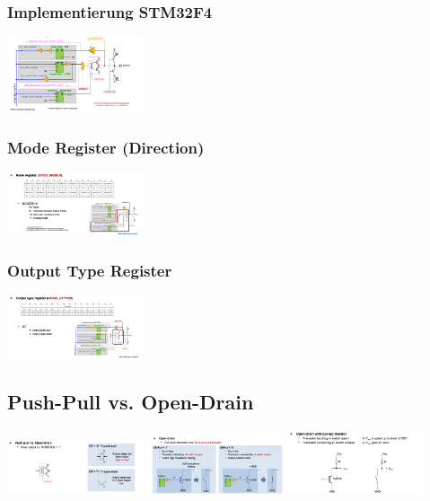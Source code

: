 \subsubsection{Implementierung STM32F4}
\includegraphics[width=0.3\textwidth]{sections/images/gpio.png}

\subsubsection{Mode Register (Direction)}
\includegraphics[width=0.3\textwidth]{sections/images/mode_register.png}

\subsubsection{Output Type Register}
\includegraphics[width=0.3\textwidth]{sections/images/out_type.png}

\subsection{Push-Pull vs. Open-Drain}
\includegraphics[width=0.3\textwidth]{sections/images/push_pull1.png}
\includegraphics[width=0.3\textwidth]{sections/images/push_pull2.png}
\includegraphics[width=0.3\textwidth]{sections/images/push_pull3.png}

